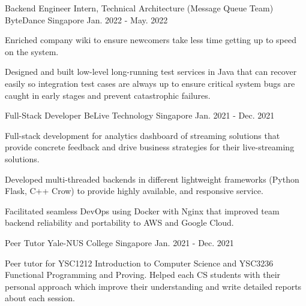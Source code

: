\begin{cventries}
  \cventry
    {Backend Engineer Intern, Technical Architecture (Message Queue Team)} %
    {ByteDance} %
    {Singapore} %
    {Jan. 2022 - May. 2022} %
    {
      \begin{cvitems} %
        \item {Enriched company wiki to ensure newcomers take less time getting up to speed on the system.}
        \item {Designed and built low-level long-running test services in Java that can recover easily so integration test cases are always up to ensure critical system bugs are caught in early stages and prevent catastrophic failures.}
      \end{cvitems}
    }

  \cventry
    {Full-Stack Developer} %
    {BeLive Technology} %
    {Singapore} %
    {Jan. 2021 - Dec. 2021} %
    {
      \begin{cvitems} %
        \item {Full-stack development for analytics dashboard of streaming solutions that provide concrete feedback and drive business strategies for their live-streaming solutions.}
        \item {Developed multi-threaded backends in different lightweight frameworks (Python Flask, C++ Crow) to provide highly available, and responsive service.}
        \item {Facilitated seamless DevOps using Docker with Nginx that improved team backend reliability and portability to AWS and Google Cloud.}
      \end{cvitems}
    }

  \cventry
    {Peer Tutor} %
    {Yale-NUS College} %
    {Singapore} %
    {Jan. 2021 - Dec. 2021} %
    {
      \begin{cvitems} %
        \item {Peer tutor for YSC1212 Introduction to Computer Science and YSC3236 Functional Programming and Proving.  Helped each CS students with their personal approach which improve their understanding and write detailed reports about each session.}
      \end{cvitems}
    }
    

\end{cventries}
